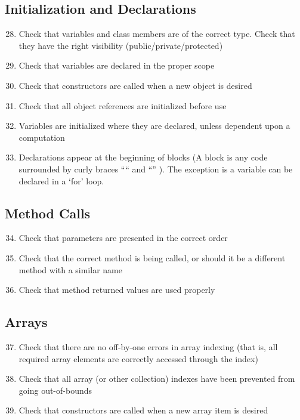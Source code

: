 	\subsection{Initialization and Declarations}
	\begin{enumerate}
		\setcounter{enumi}{27}
		\item Check that variables and class members are of the correct type. Check that they have the right visibility (public/private/protected)
		\item Check that variables are declared in the proper scope
		\item Check that constructors are called when a new object is desired
		\item Check that all object references are initialized before use
		\item Variables are initialized where they are declared, unless dependent upon a computation
		\item Declarations appear at the beginning of blocks (A block is any code surrounded by curly braces “{“ and “}” ). The exception is a variable can be declared in a ‘for’ loop.
	\end{enumerate}
	\subsection{Method Calls}
	\begin{enumerate}
		\setcounter{enumi}{33}
		\item Check that parameters are presented in the correct order
		\item Check that the correct method is being called, or should it be a different method with a similar name
		\item Check that method returned values are used properly
	\end{enumerate}
	\subsection{Arrays}
	\begin{enumerate}
		\setcounter{enumi}{36}
		\item Check that there are no off-by-one errors in array indexing (that is, all required array elements are correctly accessed through the index)
		\item Check that all array (or other collection) indexes have been prevented from going out-of-bounds
		\item Check that constructors are called when a new array item is desired
	\end{enumerate}

